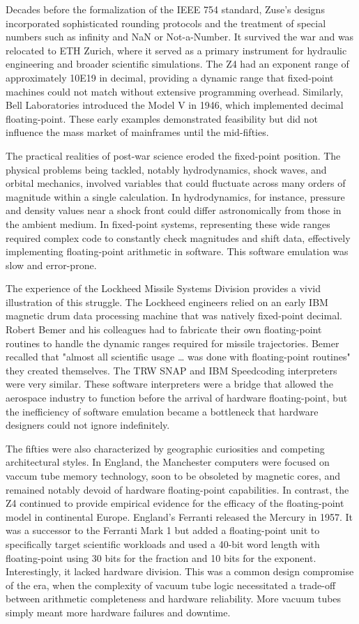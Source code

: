 Decades before the formalization of the IEEE 754 standard, Zuse’s designs incorporated sophisticated rounding protocols and the treatment of special numbers such as infinity and NaN or Not-a-Number. It survived the war and was relocated to ETH Zurich, where it served as a primary instrument for hydraulic engineering and broader scientific simulations. The Z4 had an exponent range of approximately 10E19 in decimal, providing a dynamic range that fixed-point machines could not match without extensive programming overhead. Similarly, Bell Laboratories introduced the Model V in 1946, which implemented decimal floating-point. These early examples demonstrated feasibility but did not influence the mass market of mainframes until the mid-fifties. 

The practical realities of post-war science eroded the fixed-point position. The physical problems being tackled, notably hydrodynamics, shock waves, and orbital mechanics, involved variables that could fluctuate across many orders of magnitude within a single calculation. In hydrodynamics, for instance, pressure and density values near a shock front could differ astronomically from those in the ambient medium. In fixed-point systems, representing these wide ranges required complex code to constantly check magnitudes and shift data, effectively implementing floating-point arithmetic in software. This software emulation was slow and error-prone. 

The experience of the Lockheed Missile Systems Division provides a vivid illustration of this struggle. The Lockheed engineers relied on an early IBM magnetic drum data processing machine that was natively fixed-point decimal. Robert Bemer and his colleagues had to fabricate their own floating-point routines to handle the dynamic ranges required for missile trajectories. Bemer recalled that "almost all scientific usage … was done with floating-point routines" they created themselves. The TRW SNAP and IBM Speedcoding interpreters were very similar. These software interpreters were a bridge that allowed the aerospace industry to function before the arrival of hardware floating-point, but the inefficiency of software emulation became a bottleneck that hardware designers could not ignore indefinitely. 

The fifties were also characterized by geographic curiosities and competing architectural styles. In England, the Manchester computers were focused on vaccum tube memory technology, soon to be obsoleted by magnetic cores, and remained notably devoid of hardware floating-point capabilities. In contrast, the Z4 continued to provide empirical evidence for the efficacy of the floating-point model in continental Europe. England’s Ferranti released the Mercury in 1957. It was a successor to the Ferranti Mark 1 but added a floating-point unit to specifically target scientific workloads and used a 40-bit word length with floating-point using 30 bits for the fraction and 10 bits for the exponent. Interestingly, it lacked hardware division. This was a common design compromise of the era, when the complexity of vacuum tube logic necessitated a trade-off between arithmetic completeness and hardware reliability. More vacuum tubes simply meant more hardware failures and downtime. 

